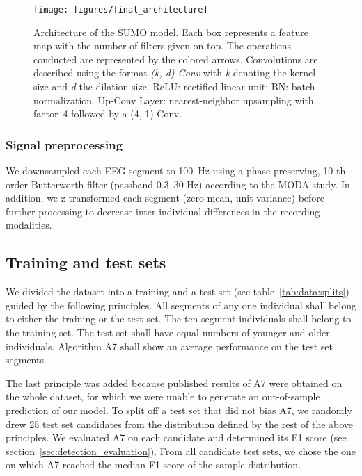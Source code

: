 \documentclass[fleqn,twocolumn,10pt]{wlscirep}
\begin{document}
\begin{figure*}[t]
	\centering
	\texttt{[image: figures/final\_architecture]}
	\caption{
		Architecture of the SUMO model. 
		Each box represents a feature map with the number of filters given on top.
		The operations conducted are represented by the colored arrows.
		Convolutions are described using the format \textit{(k, d)-Conv} with \textit{k} denoting the kernel size and \textit{d} the dilation size.
		ReLU: rectified linear unit; BN: batch normalization.
		Up-Conv Layer: nearest-neighbor upsampling with factor~4 followed by a (4, 1)-Conv.
	}
	\label{fig:final-architecture}
\end{figure*}

\subsubsection{Signal preprocessing}

We downsampled each EEG segment to 100~Hz using a phase-preserving, 10-th order Butterworth filter (passband 0.3--30 Hz) according to the MODA study.  In addition, we z-transformed each segment (zero mean, unit variance)
before further processing to decrease inter-individual differences
in the recording modalities.

\subsection{Training and test sets}
\label{sec:train-test-split}

We divided the dataset into a training
and a test set (see table~\ref{tab:data:splits}) guided by the following principles.  All segments of any one
individual shall belong to either the training or the test set.  The ten-segment
individuals shall belong to the training set.  The test set shall have equal
numbers of younger and older individuals.  Algorithm A7 shall show an average
performance on the test set segments.

The last principle was added because published results of A7 were obtained on
the whole dataset, for which we were unable to generate an out-of-sample
prediction of our model.
To split off a test set that did not bias A7, we randomly drew 25 test set
candidates from the distribution defined by the rest of the above principles.  We
evaluated A7 on each candidate and determined its F1 score (see section~\ref{sec:detection_evaluation}).  From all candidate
test sets, we chose the one on which A7 reached the median F1 score of the sample
distribution.
\end{document}
